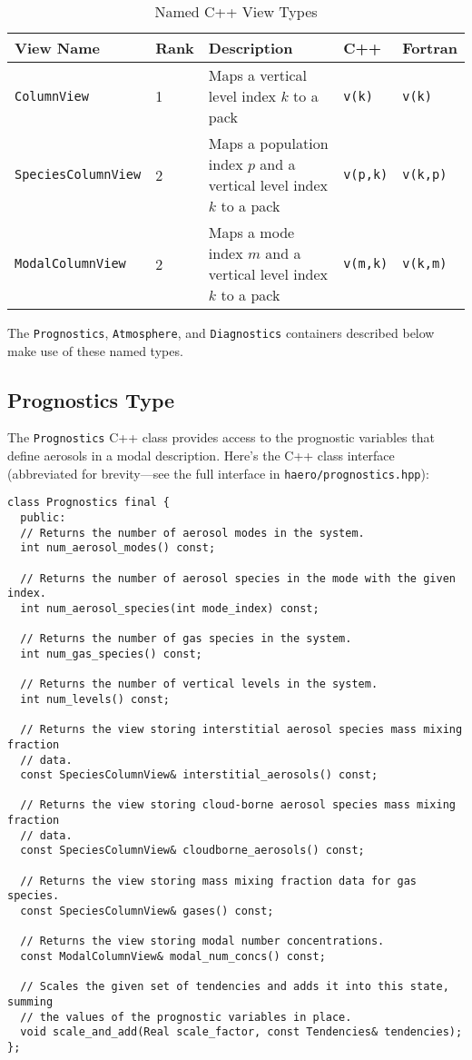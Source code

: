 \begin{table}[htbp]
\centering
\caption{Named C++ View Types}
\label{tab:viewtypes}
\begin{tabular}{|l|l|p{6cm}|l|l|}
  \toprule
  View Name & Rank & Description & C++ & Fortran \\
  \midrule
  \texttt{ColumnView} & 1 & Maps a vertical level index $k$ to a pack & \texttt{v(k)} & \texttt{v(k)} \\
  \texttt{SpeciesColumnView} & 2 & Maps a population index $p$ and a vertical level index $k$ to a pack & \texttt{v(p,k)}  & \texttt{v(k,p)} \\
  \texttt{ModalColumnView} & 2 & Maps a mode index $m$ and a vertical level index $k$ to a pack & \texttt{v(m,k)}  & \texttt{v(k,m)} \\
  \bottomrule
\end{tabular}
\end{table}

The \texttt{Prognostics}, \texttt{Atmosphere}, and \texttt{Diagnostics} containers
described below make use of these named types.

\subsection{Prognostics Type}

The \texttt{Prognostics} C++ class provides access to the prognostic variables
that define aerosols in a modal description. Here's the C++ class interface
(abbreviated for brevity---see the full interface in \texttt{haero/prognostics.hpp}):

\begin{lstlisting}
class Prognostics final {
  public:
  // Returns the number of aerosol modes in the system.
  int num_aerosol_modes() const;

  // Returns the number of aerosol species in the mode with the given index.
  int num_aerosol_species(int mode_index) const;

  // Returns the number of gas species in the system.
  int num_gas_species() const;

  // Returns the number of vertical levels in the system.
  int num_levels() const;

  // Returns the view storing interstitial aerosol species mass mixing fraction
  // data.
  const SpeciesColumnView& interstitial_aerosols() const;

  // Returns the view storing cloud-borne aerosol species mass mixing fraction
  // data.
  const SpeciesColumnView& cloudborne_aerosols() const;

  // Returns the view storing mass mixing fraction data for gas species.
  const SpeciesColumnView& gases() const;

  // Returns the view storing modal number concentrations.
  const ModalColumnView& modal_num_concs() const;

  // Scales the given set of tendencies and adds it into this state, summing
  // the values of the prognostic variables in place.
  void scale_and_add(Real scale_factor, const Tendencies& tendencies);
};
\end{lstlisting}


